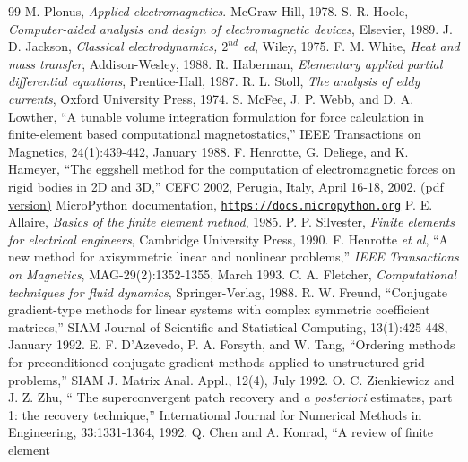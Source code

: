 \documentclass[12pt]{report}
\begin{document}
\newpage
\begin{thebibliography}{99}
 M. Plonus, {\em Applied electromagnetics}. McGraw-Hill, 1978.
 S. R. Hoole, {\em Computer-aided analysis and design of
electromagnetic devices}, Elsevier, 1989.
 J. D. Jackson, {\em Classical electrodynamics, $2^{nd}$ ed},
Wiley, 1975.
 F. M. White, {\em Heat and mass transfer}, Addison-Wesley, 1988.
 R. Haberman, {\em Elementary applied partial differential equations}, Prentice-Hall, 1987.
 R. L. Stoll, {\em The analysis of eddy currents},
Oxford University Press, 1974.
 S. McFee, J. P. Webb, and D. A. Lowther, ``A
tunable volume integration formulation for force calculation in
finite-element based computational magnetostatics,'' IEEE
Transactions on Magnetics, 24(1):439-442, January 1988.
 F. Henrotte, G. Deliege, and K. Hameyer, ``The
eggshell method for the computation of electromagnetic forces on
rigid bodies in 2D and 3D,'' CEFC 2002, Perugia, Italy, April
16-18, 2002.
\href{http://www.esat.kuleuven.ac.be/electa/publications/fulltexts/pub_942.pdf}{(pdf version)}
 MicroPython documentation,
\href{https://docs.micropython.org}{\tt https://docs.micropython.org}
 P. E. Allaire, {\em Basics of the finite element
method}, 1985.
 P. P. Silvester, {\em Finite elements for electrical engineers},
Cambridge University Press, 1990.
 F. Henrotte {\em et al}, ``A new method for
axisymmetric linear and nonlinear problems,'' {\em IEEE
Transactions on Magnetics}, MAG-29(2):1352-1355, March 1993.
 C. A. Fletcher, {\em Computational techniques
for fluid dynamics}, Springer-Verlag, 1988.
 R. W. Freund, ``Conjugate gradient-type methods
for linear systems with complex symmetric coefficient matrices,''
SIAM Journal of Scientific and Statistical Computing,
13(1):425-448, January 1992.
 E. F. D'Azevedo, P. A. Forsyth, and W. Tang,
``Ordering methods for preconditioned conjugate gradient methods
applied to unstructured grid problems,'' SIAM J. Matrix Anal.
Appl., 12(4), July 1992.
 O. C. Zienkiewicz and J. Z. Zhu, `` The
superconvergent patch recovery and {\em a posteriori} estimates,
part 1:  the recovery technique,'' International Journal for
Numerical Methods in Engineering, 33:1331-1364, 1992.
 Q. Chen and A. Konrad, ``A review of finite element

\end{thebibliography}
\end{document}
